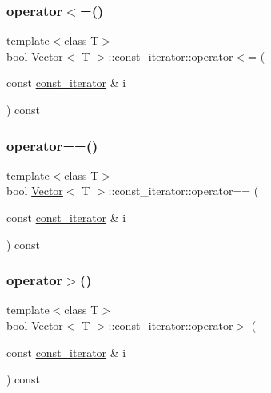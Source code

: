 \subsubsection{\texorpdfstring{operator$<$=()}{operator<=()}}
{\footnotesize\ttfamily template$<$class T$>$ \\
bool \hyperlink{classVector}{Vector}$<$ T $>$\+::const\+\_\+iterator\+::operator$<$= (\begin{DoxyParamCaption}\item[{const \hyperlink{classVector_1_1const__iterator}{const\+\_\+iterator} \&}]{i }\end{DoxyParamCaption}) const\hspace{0.3cm}{\ttfamily [inline]}}

\mbox{\label{classVector_1_1const__iterator_a6bd4b35ce30423fa93de1109fac60efd_a6bd4b35ce30423fa93de1109fac60efd}} 
\subsubsection{\texorpdfstring{operator==()}{operator==()}}
{\footnotesize\ttfamily template$<$class T$>$ \\
bool \hyperlink{classVector}{Vector}$<$ T $>$\+::const\+\_\+iterator\+::operator== (\begin{DoxyParamCaption}\item[{const \hyperlink{classVector_1_1const__iterator}{const\+\_\+iterator} \&}]{i }\end{DoxyParamCaption}) const\hspace{0.3cm}{\ttfamily [inline]}}

\mbox{\label{classVector_1_1const__iterator_af5064ab82341e26c1518b228acc0f824_af5064ab82341e26c1518b228acc0f824}} 
\subsubsection{\texorpdfstring{operator$>$()}{operator>()}}
{\footnotesize\ttfamily template$<$class T$>$ \\
bool \hyperlink{classVector}{Vector}$<$ T $>$\+::const\+\_\+iterator\+::operator$>$ (\begin{DoxyParamCaption}\item[{const \hyperlink{classVector_1_1const__iterator}{const\+\_\+iterator} \&}]{i }\end{DoxyParamCaption}) const\hspace{0.3cm}{\ttfamily [inline]}}

